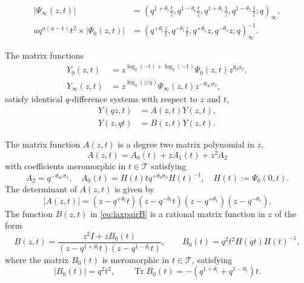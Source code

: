 \documentclass[10pt,a4paper]{amsart}
\begin{document}
\begin{equation}\label{eq:det}
\begin{aligned}
   |\Psi_\infty(z,t)|&=\left(q^{1+\theta_t}\frac{t}{z},q^{1-\theta_t}\frac{t}{z},q^{1+\theta_1}\frac{1}{z},q^{1-\theta_1}\frac{1}{z};q\right)_\infty,\\
   aq^{u(u-1)}t^2\times |\Psi_0(z,t)|&= \left(q^{+\theta_t}\frac{z}{t},q^{-\theta_t}\frac{z}{t},q^{+\theta_1}z,q^{-\theta_1}z;q\right)_\infty^{-1}.
\end{aligned}
\end{equation}

\begin{proposition}\label{prop:lax}
    The matrix functions
\begin{align*}
Y_0(z,t)&=z^{\log_q(-t)+\log_q(-1)}\Psi_0(z,t)z^{\theta_0\sigma_3},\\
Y_\infty(z,t)&=z^{\log_q(z/q)}\Psi_\infty(z,t) z^{-\theta_\infty\sigma_3},
\end{align*}
satisfy identical $q$-difference systems with respect to $z$ and $t$,
\begin{subequations}\label{eq:laxpair}
\begin{align}
   Y(qz,t)&=A(z,t)Y(z,t),\label{eq:laxpairA}\\
   Y(z,qt)&=B(z,t)Y(z,t). \label{eq:laxpairB}
\end{align}
\end{subequations}

The matrix function $A(z,t)$ is a degree two matrix polynomial in $z$,
\begin{equation}\label{eq:lin_sys}
   A(z,t)=A_0(t)+zA_1(t)+z^2 A_2
\end{equation}
with coefficients meromorphic in $t\in \mathcal{T}$ satisfying
\begin{equation}\label{eq:Amats}
A_2= q^{-\theta_\infty \sigma_3},\quad A_0(t)=H(t)t  q^{+\theta_0 \sigma_3}  H(t)^{-1},\quad H(t):=\Psi_0(0,t).
\end{equation}
The determinant of $A(z,t)$ is given by
\begin{equation}\label{eq:detA}
|A(z,t)|=(z-q^{+\theta_t}t)(z-q^{-\theta_t}t)(z-q^{+\theta_1})(z-q^{-\theta_1}).
\end{equation}
The function $B(z,t)$ in \eqref{eq:laxpairB} is a rational matrix function in $z$ of the form
\begin{equation*}
    B(z,t)=\frac{z^2I+zB_0(t)}{(z-q^{1+\theta_t}t)(z-q^{1-\theta_t}t)},\qquad B_0(t)=q^{2}t^{2}H(qt)H(t)^{-1},
\end{equation*}
where the matrix $B_0(t)$ is meromorphic in $t\in \mathcal{T}$, satisfying
\begin{equation*}
    |B_0(t)|=q^2 t^2,\qquad \operatorname{Tr} B_0(t)=-(q^{1+\theta_t}+q^{1-\theta_t})t.
\end{equation*}
\end{proposition}
\end{document}
